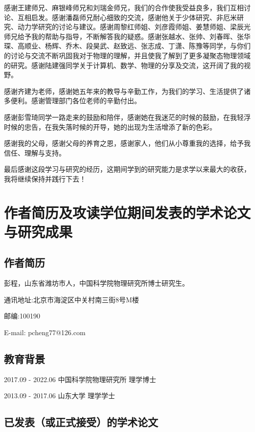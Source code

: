 感谢王建师兄、麻银峰师兄和刘瑞金师兄，我们的合作使我受益良多，我们互相讨论、互相启发。感谢潘磊师兄耐心细致的交流，感谢他关于少体研究、非厄米研究、动力学研究的讨论与建议。感谢周黎红师姐、刘彦霞师姐、姜慧师姐、梁辰光师兄给予我的帮助与指导，不断解答我的疑惑。感谢张越水、张帅、刘春晖、张华琛、高顺业、杨辉、乔木、段昊武、赵致远、张志成、丁潇、陈豫等同学，与你们的讨论与交流不断巩固我对于物理的理解，并且使我了解到了更多凝聚态物理领域的研究。感谢陆建强同学关于计算机、数学、物理的分享及交流，这开阔了我的视野。

感谢齐建为老师，感谢她五年来的教导与辛勤工作，为我们的学习、生活提供了诸多便利。感谢管理部门各位老师的辛勤付出。

感谢彭雪琦同学一路走来的鼓励和陪伴，感谢她在我迷茫的时候的鼓励，在我轻浮时候的忠告，在我失落时候的开导，她的出现为生活增添了新的色彩。

感谢我的父母，感谢父母的养育之恩，感谢家人，他们从小尊重我的选择，给予我信任、理解与支持。

最后感谢这段学习与研究的经历，这期间学到的研究能力是求学以来最大的收获，我将继续保持并践行下去！

\chapter{作者简历及攻读学位期间发表的学术论文与研究成果}


\section*{作者简历}

彭程，山东省潍坊市人，中国科学院物理研究所博士研究生。

通讯地址:北京市海淀区中关村南三街8号M楼 

邮编:100190

E-mail: pcheng77@126.com

\section*{教育背景}

2017.09 - 2022.06 中国科学院物理研究所 理学博士

2013.09 - 2017.06 山东大学 理学学士

\section*{已发表（或正式接受）的学术论文}


